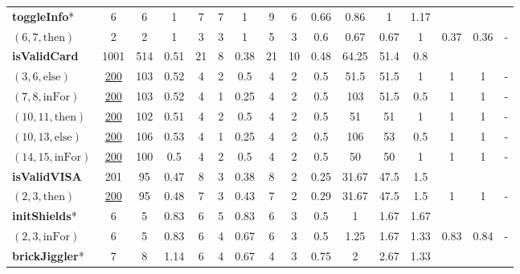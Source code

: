 \documentclass[sigconf,review,anonymous]{acmart}
\newcommand{\thenBr}{\text{then}}
\newcommand{\elseBr}{\text{else}}
\newcommand{\inFor}{\text{inFor}}
\newcommand{\un}[1]{\underline{#1}}
\begin{document}
\begin{table}[!t]
\begin{tabular}{l|ccc|ccc|ccc|ccc|ccc}
    \hline
   \textbf{toggleInfo}*      & 6        & 6    & 1         & 7  & 7 & 1                 & 9 & 6   & 0.66               & 0.86  & 1     & 1.17  &    &      &       \\
    $(6,7,\thenBr)$          & 2        & 2    & 1         & 3  & 3 & 1                 & 5 & 3   & 0.6                & 0.67  & 0.67  & 1     & 0.37 & 0.36 & -  \\
    \hline
   \textbf{isValidCard}      & 1001     & 514  & 0.51      & 21 & 8 & 0.38              & 21 & 10 & 0.48               & 64.25 & 51.4  & 0.8    &   &   &       \\
    $(3,6,\elseBr)$          & \un{200} & 103  & 0.52      & 4  & 2 & 0.5               & 4  & 2  & 0.5                & 51.5  & 51.5  & 1      & 1 & 1 & -   \\
    $(7,8,\inFor)$           & \un{200} & 103  & 0.52      & 4  & 1 & 0.25              & 4  & 2  & 0.5                & 103   & 51.5  & 0.5    & 1 & 1 & -  \\
    $(10,11,\thenBr)$        & \un{200} & 102  & 0.51      & 4  & 2 & 0.5               & 4  & 2  & 0.5                & 51    & 51    & 1      & 1 & 1 & -  \\
    $(10,13,\elseBr)$        & \un{200} & 106  & 0.53      & 4  & 1 & 0.25              & 4  & 2  & 0.5                & 106   & 53    & 0.5    & 1 & 1 & -  \\
    $(14,15,\inFor)$         & \un{200} & 100  & 0.5       & 4  & 2 & 0.5               & 4  & 2  & 0.5                & 50    & 50    & 1      & 1 & 1 & -  \\
    \hline
   \textbf{isValidVISA}      & 201      & 95   & 0.47      & 8  & 3 & 0.38              & 8  & 2  & 0.25               & 31.67 & 47.5  & 1.5    &   &   &       \\
    $(2,3,\thenBr)$          & \un{200} & 95   & 0.48      & 7  & 3 & 0.43              & 7  & 2  & 0.29               & 31.67 & 47.5  & 1.5    & 1 & 1 & -  \\
    \hline
   \textbf{initShields}*     & 6        & 5    & 0.83      & 6  & 5 & 0.83              & 6  & 3  & 0.5                & 1      & 1.67 & 1.67   &      &      &       \\
    $(2,3,\inFor)$           & 6        & 5    & 0.83      & 6  & 4 & 0.67              & 6  & 3  & 0.5                & 1.25   & 1.67 & 1.33   & 0.83 & 0.84 & -  \\
    \hline
   \textbf{brickJiggler}*    & 7        & 8    & 1.14      & 6  & 4 & 0.67              & 4  & 3  & 0.75               & 2      & 2.67 & 1.33   &      &      &       \\

\end{tabular}
\end{table}
\end{document}

